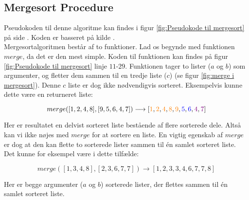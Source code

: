 \subsection{Mergesort Procedure}%
\label{sub:Mergesort Procedure}

Pseudokoden til denne algoritme kan findes i figur \ref{fig:Pseudokode til mergesort} på side \pageref{fig:Pseudokode til mergesort}. Koden er basseret på kilde \cite[s. 106]{aogd}.\\

Mergesortalgoritmen består af to funktioner. Lad os begynde med funktionen $merge$, da det er den mest simple. Koden til funktionen kan findes på figur \ref{fig:Pseudokode til mergesort} linje $11$-$29$. Funktionen tager to lister ($a$ og $b$) som argumenter, og fletter dem sammen til en tredje liste ($c$) (se figur \ref{fig:merge i mergesort}). Denne $c$ liste er dog ikke nødvendigvis sorteret. Eksempelvis kunne dette være en returneret liste:

$$merge([1,2,4,8],[9,5,6,4,7]) \longrightarrow [\color{orange}1\color{black}, \color{orange}2\color{black}, \color{orange}4\color{black}, \color{orange}8\color{black}, \color{orange}9\color{black}, \color{blue}5\color{black}, \color{blue}6\color{black}, \color{violet}4\color{black}, \color{violet}7\color{black}]$$

Her er resultatet en delvist sorteret liste bestående af flere sorterede dele. Altså kan vi ikke nøjes med $merge$ for at sortere en liste. En vigtig egenskab af $merge$ er dog at den kan flette to sorterede lister sammen til én samlet sorteret liste. Det kunne for eksempel være i dette tilfælde:

$$merge([1,3,4,8],[2,3,6,7,7]) \longrightarrow [1, 2, 3, 3, 4, 6, 7, 7, 8]$$

Her er begge argumenter ($a$ og $b$) sorterede lister, der flettes sammen til én samlet sorteret liste.\\


